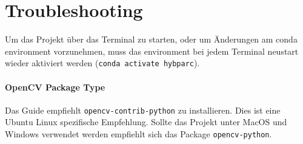 \documentclass[a4paper]{article}
\newcommand{\code}[1]{\texttt{#1}}
\begin{document}
\section{Troubleshooting}
\label{sec:troubleshooting}

Um das Projekt über das Terminal zu starten, oder um Änderungen am conda environment vorzunehmen, muss das environment bei jedem Terminal neustart wieder aktiviert werden (\code{conda activate hybparc}).

\paragraph{OpenCV Package Type}
Das Guide empfiehlt \code{opencv-contrib-python} zu installieren. Dies ist eine Ubuntu Linux spezifische Empfehlung. Sollte das Projekt unter MacOS und Windows verwendet werden empfiehlt sich das Package \code{opencv-python}.
\end{document}
